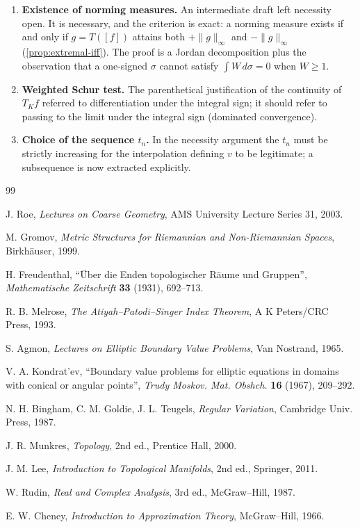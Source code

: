 \documentclass[11pt,a4paper]{article}
\numberwithin{equation}{section}
\theoremstyle{plain}
\theoremstyle{definition}
\theoremstyle{remark}
\begin{document}
\begin{enumerate}
\item \textbf{Existence of norming measures.} An intermediate draft left necessity open. It
is necessary, and the criterion is exact: a norming measure exists if and only if
$g=T([f])$ attains both $+\|g\|_\infty$ and $-\|g\|_\infty$
(\cref{prop:extremal-iff}). The proof is a Jordan decomposition plus the observation that
a one-signed $\sigma$ cannot satisfy $\int W\,d\sigma=0$ when $W\ge1$.

\item \textbf{Weighted Schur test.} The parenthetical justification of the continuity of
$T_Kf$ referred to differentiation under the integral sign; it should refer to passing to
the limit under the integral sign (dominated convergence).

\item \textbf{Choice of the sequence $t_n$.} In the necessity argument the $t_n$ must be
strictly increasing for the interpolation defining $v$ to be legitimate; a subsequence is
now extracted explicitly.

\end{enumerate}

\begin{thebibliography}{99}

J. Roe, \emph{Lectures on Coarse Geometry}, AMS University Lecture Series 31, 2003.

M. Gromov, \emph{Metric Structures for Riemannian and Non-Riemannian Spaces},
Birkh\"auser, 1999.

H. Freudenthal, ``\"Uber die Enden topologischer R\"aume und Gruppen'',
\emph{Mathematische Zeitschrift} \textbf{33} (1931), 692--713.

R. B. Melrose, \emph{The Atiyah--Patodi--Singer Index Theorem}, A K Peters/CRC Press, 1993.

S. Agmon, \emph{Lectures on Elliptic Boundary Value Problems}, Van Nostrand, 1965.

V. A. Kondrat'ev, ``Boundary value problems for elliptic equations in domains with conical
or angular points'', \emph{Trudy Moskov. Mat. Obshch.} \textbf{16} (1967), 209--292.

N. H. Bingham, C. M. Goldie, J. L. Teugels, \emph{Regular Variation}, Cambridge Univ.
Press, 1987.

J. R. Munkres, \emph{Topology}, 2nd ed., Prentice Hall, 2000.

J. M. Lee, \emph{Introduction to Topological Manifolds}, 2nd ed., Springer, 2011.

W. Rudin, \emph{Real and Complex Analysis}, 3rd ed., McGraw--Hill, 1987.

E. W. Cheney, \emph{Introduction to Approximation Theory}, McGraw--Hill, 1966.

\end{thebibliography}
\end{document}
